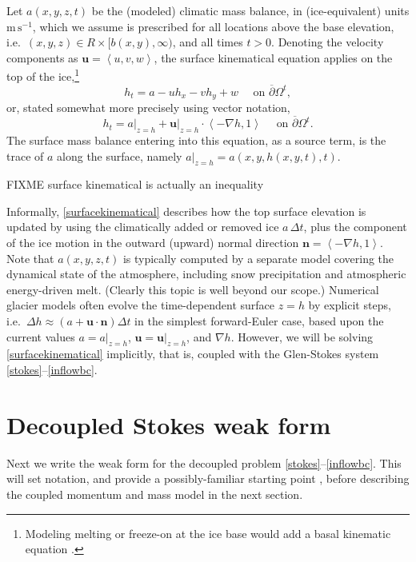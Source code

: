 \documentclass[letterpaper,final,12pt,reqno]{amsart}
\newcommand{\grad}{\nabla}
\newcommand{\bn}{\mathbf{n}}
\newcommand{\bu}{\mathbf{u}}
\begin{document}
Let $a(x,y,z,t)$ be the (modeled) climatic mass balance, in (ice-equivalent) units $\text{m}\,\text{s}^{-1}$, which we assume is prescribed for all locations above the base elevation, i.e.~$(x,y,z) \in R\times[b(x,y),\infty)$, and all times $t>0$.  Denoting the velocity components as $\bu=\left<u,v,w\right>$, the surface kinematical equation \cite{GreveBlatter2009} applies on the top of the ice,\footnote{Modeling melting or freeze-on at the ice base would add a basal kinematic equation \cite{Aschwandenetal2012}.}
    $$h_t = a - u h_x - v h_y + w \quad \text{ on } \overline{\partial}\Omega^t,$$
or, stated somewhat more precisely using vector notation,
\begin{equation}
h_t = a\big|_{z=h} + \bu\big|_{z=h} \cdot \left<-\grad h,1\right> \quad \text{ on } \overline{\partial}\Omega^t. \label{surfacekinematical}
\end{equation}
The surface mass balance entering into this equation, as a source term, is the trace of $a$ along the surface, namely $a\big|_{z=h}=a(x,y,h(x,y,t),t)$.

FIXME surface kinematical is actually an inequality

Informally, \eqref{surfacekinematical} describes how the top surface elevation is updated by using the climatically added or removed ice $a\,\Delta t$, plus the component of the ice motion in the outward (upward) normal direction $\bn = \left<-\grad h,1\right>$.  Note that $a(x,y,z,t)$ is typically computed by a separate model covering the dynamical state of the atmosphere, including snow precipitation and atmospheric energy-driven melt.  (Clearly this topic is well beyond our scope.)  Numerical glacier models often evolve the time-dependent surface $z=h$ by explicit steps, i.e.~$\Delta h \approx \left(a + \bu\cdot \bn\right) \Delta t$ in the simplest forward-Euler case, based upon the current values $a=a\big|_{z=h}$, $\bu= \bu\big|_{z=h}$, and $\grad h$.  However, we will be solving \eqref{surfacekinematical} implicitly, that is, coupled with the Glen-Stokes system \eqref{stokes}--\eqref{inflowbc}.


\section{Decoupled Stokes weak form} \label{sec:weakstokes}

Next we write the weak form for the decoupled problem \eqref{stokes}--\eqref{inflowbc}.  This will set notation, and provide a possibly-familiar starting point \cite[for example]{Bueler2021,Elmanetal2014}, before describing the coupled momentum and mass model in the next section.
\end{document}
